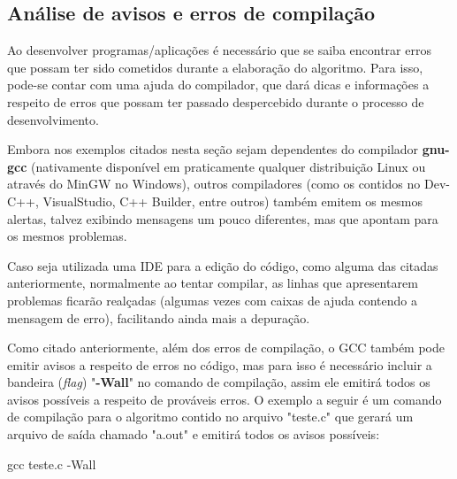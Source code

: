 \documentclass[12pt]{article}
\newcommand\tab[1][1cm]{\hspace*{#1}}
\begin{document}
\subsection{Análise de avisos e erros de compilação}

\par\tab Ao desenvolver programas/aplicações é necessário que se saiba encontrar erros que possam ter sido cometidos durante a elaboração do algoritmo. Para isso, pode-se contar com uma ajuda do compilador, que dará dicas e informações a respeito de erros que possam ter passado despercebido durante o processo de desenvolvimento.

\hspace{0.25cm}
\begin{tcolorbox}[colback=blue!5!white,colframe=blue!75!black,title=Dica!]
  \par\tab Embora nos exemplos citados nesta seção sejam dependentes do compilador \textbf{gnu-gcc} (nativamente disponível em praticamente qualquer distribuição Linux ou através do MinGW no Windows), outros compiladores (como os contidos no Dev-C++, VisualStudio, C++ Builder, entre outros) também emitem os mesmos alertas, talvez exibindo mensagens um pouco diferentes, mas que apontam para os mesmos problemas.
  \par\tab Caso seja utilizada uma IDE para a edição do código, como alguma das citadas anteriormente, normalmente ao tentar compilar, as linhas que apresentarem problemas ficarão realçadas (algumas vezes com caixas de ajuda contendo a mensagem de erro), facilitando ainda mais a depuração.
\end{tcolorbox}

\par\tab Como citado anteriormente, além dos erros de compilação, o GCC também pode emitir avisos a respeito de erros no código, mas para isso é necessário incluir a bandeira (\textit{flag}) "\textbf{-Wall}" no comando de compilação, assim ele emitirá todos os avisos possíveis a respeito de prováveis erros. O exemplo a seguir é um comando de compilação para o algoritmo contido no arquivo "teste.c" que gerará um arquivo de saída chamado "a.out" e emitirá todos os avisos possíveis:

\hspace{0.25cm}
\begin{tcolorbox}[colback=black!5!white,colframe=black!75!white,title=Console: usuario@fedora:\~/Exemplos]
    \par gcc teste.c -Wall
\end{tcolorbox}
\end{document}
